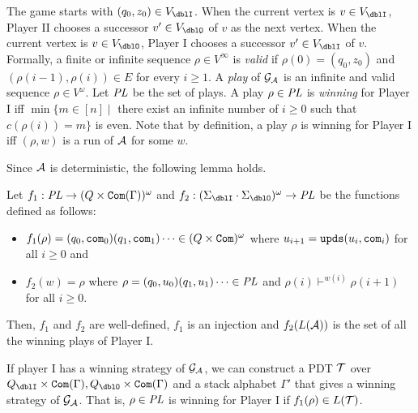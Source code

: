 The game starts with $(q_0,z_0)\in V_\dblI$.
When the current vertex is $v\in V_\dblI$,
Player II chooses a successor $v'\in V_\dblO$ of $v$ as the next vertex.
When the current vertex is $v\in V_\dblO$,
Player I chooses a successor $v'\in V_\dblI$ of $v$.
Formally, a finite or infinite sequence $\rho\in V^\infty$ is
\emph{valid} if
$\rho(0)=(q_0,z_0)$ and
$(\rho(i-1), \rho(i))\in E$ for every $i\geq 1$.
A \emph{play} of ${\cal G}_{\cal A}$ is an infinite and valid sequence $\rho\in V^\omega$.
Let $\mathit{PL}$ be the set of plays.
A play $\rho\in \mathit{PL}$ is \emph{winning} for Player I iff
$\min\{m\in[n] \mid $ there exist an infinite
number of $i\geq 0$ such that $c(\rho(i)) = m\}$ is even.
Note that by definition, a play $\rho$ is winning for Player I iff $(\rho,w)$ is a run of ${\cal A}$ for some $w$.

Since ${\cal A}$ is deterministic,
the following lemma holds.
\begin{lemma}
\label{lem: cor}
Let $f_1: \mathit{PL}\to(Q\times\mathtt{Com}(\Gamma))^\omega$ and
$f_2: (\Sigma_\dblI\cdot\Sigma_\dblO)^\omega \to \PL$ be the functions defined as follows:
\begin{itemize}
\item $f_1(\rho)=(q_0,\mathtt{com}_0)(q_1,\mathtt{com}_1)\cdots\in (Q\times\mathtt{Com})^\omega$ where
$u_{i+1} = \mathtt{upds}(u_{i},\mathtt{com}_i)$
for all $i\geq 0$ and
\item $f_2(w)=\rho$ where $\rho=(q_0,u_0)(q_1,u_1)\cdots\in \mathit{PL}$ and
$\rho(i)\vdash^{w(i)} \rho(i+1)$ for all $i\geq 0$.
\end{itemize}
Then, $f_1$ and $f_2$ are well-defined,
$f_1$ is an injection and $f_2(L({\cal A}))$ is the set of all the winning plays of Player I.
\end{lemma}
\begin{theorem}{\cite{Wa96}}
\label{the: wal}
If player I has a winning strategy of ${\cal G}_{\cal A}$,
we can construct a PDT ${\cal T}$ over $Q_\dblI\times\Com(\Gamma), Q_\dblO\times\Com(\Gamma)$ and a stack alphabet $\Gamma'$ that gives a winning strategy of ${\cal G}_{\cal A}$.
That is, $\rho\in \mathit{PL}$ is winning for Player I if $f_1(\rho)\in L({\cal T})$.
\end{theorem}

